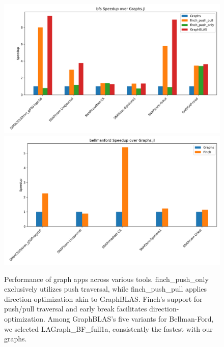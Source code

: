 \begin{figure}
	\includegraphics[width=0.5\linewidth]{bfs_speedup_over_graphs.jl.png}%
	\includegraphics[width=0.5\linewidth]{bellmanford_speedup_over_graphs.jl.png}
    \vspace{-12pt}
    \caption{Performance of graph apps across various tools. finch\_push\_only exclusively utilizes push traversal, while finch\_push\_pull applies direction-optimization akin to GraphBLAS. Finch's support for push/pull traversal and early break facilitates direction-optimization. Among GraphBLAS's five variants for Bellman-Ford, we selected LAGraph\_BF\_full1a, consistently the fastest with our graphs.}
     \label{fig:graph_result}
\end{figure}


